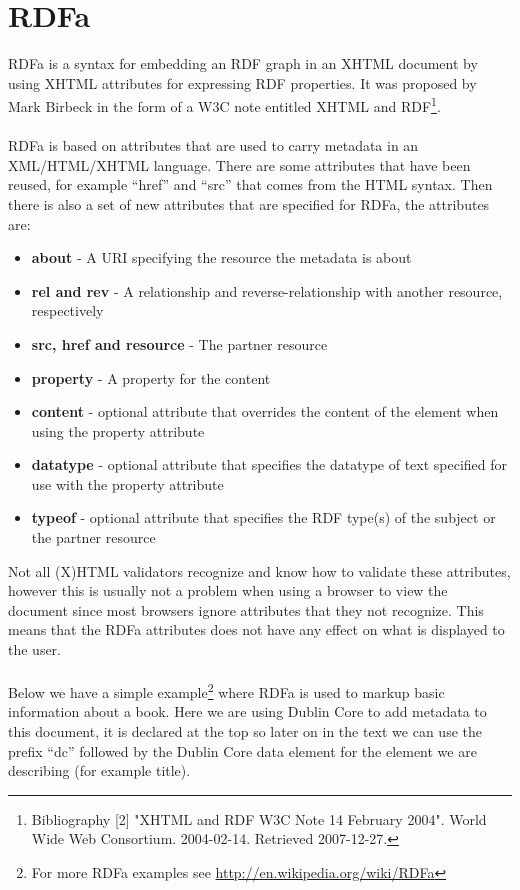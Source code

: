 \section{RDFa}
RDFa is a syntax for embedding an RDF graph in an XHTML document by using XHTML attributes for expressing RDF properties. It was proposed by Mark Birbeck in the form of a W3C note entitled XHTML and RDF\footnote{Bibliography [2] "XHTML and RDF W3C Note 14 February 2004". World Wide Web Consortium. 2004-02-14. Retrieved 2007-12-27.}.\\\\
RDFa is based on attributes that are used to carry metadata in an XML/HTML/XHTML language. There are some attributes that have been reused, for example “href” and “src” that comes from the HTML syntax. Then there is also a set of new attributes that are specified for RDFa, the attributes are: 
\begin{itemize}
\item \textbf{about} - A URI specifying the resource the metadata is about
\item \textbf{rel and rev} - A relationship and reverse-relationship with another resource, respectively
\item \textbf{src, href and resource} - The partner resource
\item \textbf{property} - A property for the content
\item \textbf{content} - optional attribute that overrides the content of the element when using the property attribute
\item \textbf{datatype} - optional attribute that specifies the datatype of text specified for use with the property attribute
\item \textbf{typeof} - optional attribute that specifies the RDF type(s) of the subject or the partner resource
\end{itemize}
Not all (X)HTML validators recognize and know how to validate these attributes, however this is usually not a problem when using a browser to view the document since most browsers ignore attributes that they not recognize. This means that the RDFa attributes does not have any effect on what is displayed to the user.\\\\
Below we have a simple example\footnote{For more RDFa examples see \url{http://en.wikipedia.org/wiki/RDFa}} where RDFa is used to markup basic information about a book. Here we are using Dublin Core to add metadata to this document, it is declared at the top so later on in the text we can use the prefix “dc” followed by the Dublin Core data element for the element we are describing (for example title).\\  
